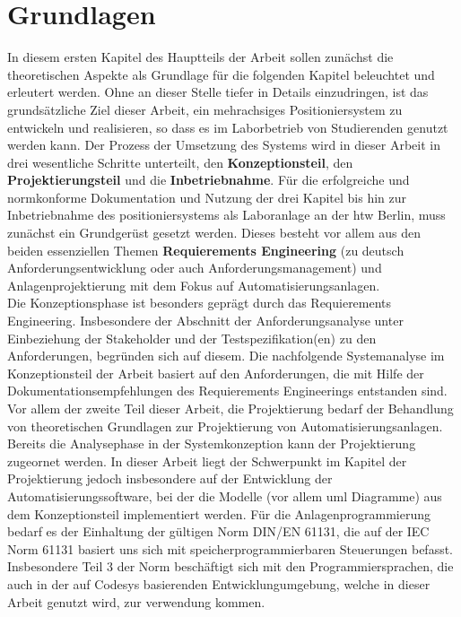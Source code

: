 \documentclass[../../Bachelorarbeit.tex]{subfiles}
\begin{document}
\section{Grundlagen}
In diesem ersten Kapitel des Hauptteils der Arbeit sollen zunächst die theoretischen Aspekte als Grundlage für die folgenden Kapitel beleuchtet und erleutert werden. Ohne an dieser Stelle tiefer in Details einzudringen, ist das grundsätzliche Ziel dieser Arbeit, ein mehrachsiges Positioniersystem zu entwickeln und realisieren, so dass es im Laborbetrieb von Studierenden genutzt werden kann. Der Prozess der Umsetzung des Systems wird in dieser Arbeit in drei wesentliche Schritte unterteilt, den \textbf{Konzeptionsteil}, den \textbf{Projektierungsteil} und die \textbf{Inbetriebnahme}. Für die erfolgreiche und normkonforme Dokumentation und Nutzung der drei Kapitel bis hin zur Inbetriebnahme des positioniersystems als Laboranlage an der \ac{htw} Berlin, muss zunächst ein Grundgerüst gesetzt werden. Dieses besteht vor allem aus den beiden essenziellen Themen \textbf{Requierements Engineering} (zu deutsch Anforderungsentwicklung oder auch Anforderungsmanagement) und Anlagenprojektierung mit dem Fokus auf Automatisierungsanlagen.\\
Die Konzeptionsphase ist besonders geprägt durch das Requierements Engineering. Insbesondere der Abschnitt der Anforderungsanalyse unter Einbeziehung der Stakeholder und der Testspezifikation(en) zu den Anforderungen, begründen sich auf diesem. Die nachfolgende Systemanalyse im Konzeptionsteil der Arbeit basiert auf den Anforderungen, die mit Hilfe der Dokumentationsempfehlungen des Requierements Engineerings entstanden sind.\\
Vor allem der zweite Teil dieser Arbeit, die Projektierung bedarf der Behandlung von theoretischen Grundlagen zur Projektierung von Automatisierungsanlagen. Bereits die Analysephase in der Systemkonzeption kann der Projektierung zugeornet werden. In dieser Arbeit liegt der Schwerpunkt im Kapitel der Projektierung jedoch insbesondere auf der Entwicklung der Automatisierungssoftware, bei der die Modelle (vor allem \acs{uml} Diagramme) aus dem Konzeptionsteil implementiert werden. Für die Anlagenprogrammierung bedarf es der Einhaltung der gültigen Norm DIN/EN 61131, die auf der IEC Norm 61131 basiert uns sich mit speicherprogrammierbaren Steuerungen befasst. Insbesondere Teil 3 der Norm beschäftigt sich mit den Programmiersprachen, die auch in der auf Codesys basierenden Entwicklungumgebung, welche in dieser Arbeit genutzt wird, zur verwendung kommen. \\
\end{document}
